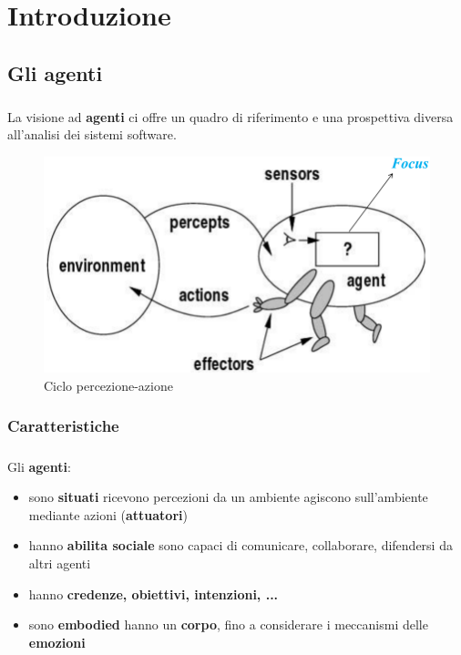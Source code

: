 \documentclass[a4paper, 12pt]{report}
\begin{document}
    \tableofcontents
    \chapter{Introduzione}
        \section{Gli agenti}
            \paragraph{}La visione ad \textbf{agenti} ci offre un quadro di riferimento 
            e una prospettiva diversa all’analisi dei sistemi 
            software.
            \begin{figure}[htbp]
                \centering
                \includegraphics[scale=0.22]{Media/CicloPercezioneAzione.png}
                \caption{Ciclo percezione-azione}
            \end{figure}
            \subsection{Caratteristiche}
            \paragraph{} Gli \textbf{agenti}:
                \begin{itemize}
                    \item sono \textbf{situati}
                        \subitem ricevono percezioni da un ambiente
                        \subitem agiscono sull'ambiente mediante azioni (\textbf{attuatori})
                    \item hanno \textbf{abilita sociale}
                        \subitem sono capaci di comunicare, collaborare, difendersi da 
                        altri agenti
                    \item hanno \textbf{credenze, obiettivi, intenzioni, ...} 
                    \item sono \textbf{embodied}
                        \subitem hanno un \textbf{corpo}, fino a 
                        considerare i meccanismi delle \textbf{emozioni}
                \end{itemize}
\end{document}
